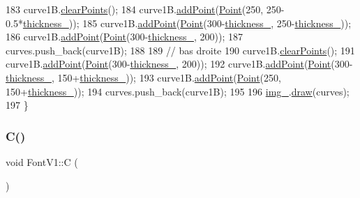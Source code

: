 \begin{DoxyCode}
183     curve1B.\mbox{\hyperlink{class_bezier_curve_a0ba8ce66d5af5971ae6a1b506029728e}{clearPoints}}();
184     curve1B.\mbox{\hyperlink{class_bezier_curve_a38d16c18b36ae45619b05e26e226cf34}{addPoint}}(\mbox{\hyperlink{class_point}{Point}}(250, 250-0.5*\mbox{\hyperlink{class_font_v1_aed8040e76be9a52833627b92f0fb4e5f}{thickness\_}}));
185     curve1B.\mbox{\hyperlink{class_bezier_curve_a38d16c18b36ae45619b05e26e226cf34}{addPoint}}(\mbox{\hyperlink{class_point}{Point}}(300-\mbox{\hyperlink{class_font_v1_aed8040e76be9a52833627b92f0fb4e5f}{thickness\_}}, 250-\mbox{\hyperlink{class_font_v1_aed8040e76be9a52833627b92f0fb4e5f}{thickness\_}}));
186     curve1B.\mbox{\hyperlink{class_bezier_curve_a38d16c18b36ae45619b05e26e226cf34}{addPoint}}(\mbox{\hyperlink{class_point}{Point}}(300-\mbox{\hyperlink{class_font_v1_aed8040e76be9a52833627b92f0fb4e5f}{thickness\_}}, 200));
187     curves.push\_back(curve1B);
188 
189     \textcolor{comment}{// bas droite}
190     curve1B.\mbox{\hyperlink{class_bezier_curve_a0ba8ce66d5af5971ae6a1b506029728e}{clearPoints}}();
191     curve1B.\mbox{\hyperlink{class_bezier_curve_a38d16c18b36ae45619b05e26e226cf34}{addPoint}}(\mbox{\hyperlink{class_point}{Point}}(300-\mbox{\hyperlink{class_font_v1_aed8040e76be9a52833627b92f0fb4e5f}{thickness\_}}, 200));
192     curve1B.\mbox{\hyperlink{class_bezier_curve_a38d16c18b36ae45619b05e26e226cf34}{addPoint}}(\mbox{\hyperlink{class_point}{Point}}(300-\mbox{\hyperlink{class_font_v1_aed8040e76be9a52833627b92f0fb4e5f}{thickness\_}}, 150+\mbox{\hyperlink{class_font_v1_aed8040e76be9a52833627b92f0fb4e5f}{thickness\_}}));
193     curve1B.\mbox{\hyperlink{class_bezier_curve_a38d16c18b36ae45619b05e26e226cf34}{addPoint}}(\mbox{\hyperlink{class_point}{Point}}(250, 150+\mbox{\hyperlink{class_font_v1_aed8040e76be9a52833627b92f0fb4e5f}{thickness\_}}));
194     curves.push\_back(curve1B);
195 
196     \mbox{\hyperlink{class_font_v1_a00569e3e3c4b70f437b63f396f735fb0}{img\_}}.\mbox{\hyperlink{class_image_a8d162f3cab956131d58708c09aa560b0}{draw}}(curves);
197 \}
\end{DoxyCode}
\mbox{\label{class_font_v1_a80602716ae6907fa518fbb50eeda2515}} 
\subsubsection{\texorpdfstring{C()}{C()}}
{\footnotesize\ttfamily void Font\+V1\+::C (\begin{DoxyParamCaption}{ }\end{DoxyParamCaption})}



